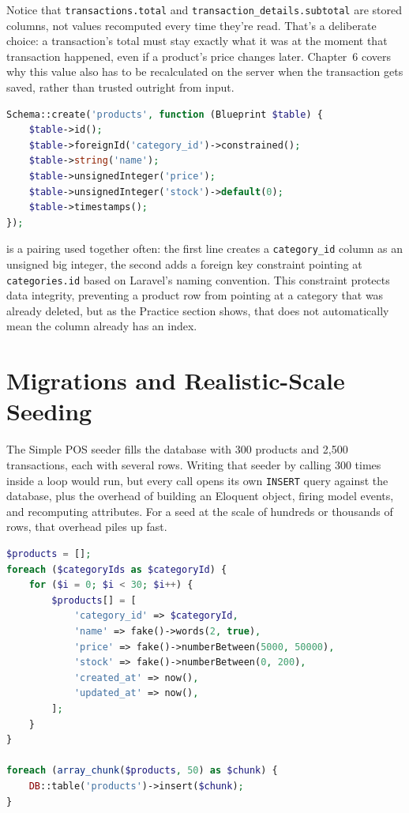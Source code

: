 Notice that \texttt{transactions.total} and
\texttt{transaction\_details.subtotal} are stored columns, not values
recomputed every time they're read. That's a deliberate choice: a
transaction's total must stay exactly what it was at the moment that
transaction happened, even if a product's price changes later.
Chapter~6 covers why this value also has to be recalculated on the
server when the transaction gets saved, rather than trusted outright
from input.

\begin{lstlisting}[language=php, title=\lstfile{database/migrations/2026_08_20_122440_create_products_table.php}]
Schema::create('products', function (Blueprint $table) {
    $table->id();
    $table->foreignId('category_id')->constrained();
    $table->string('name');
    $table->unsignedInteger('price');
    $table->unsignedInteger('stock')->default(0);
    $table->timestamps();
});
\end{lstlisting}

 is a pairing used
together often: the first line creates a \texttt{category\_id} column as
an unsigned big integer, the second adds a foreign key constraint
pointing at \texttt{categories.id} based on Laravel's naming
convention. This constraint protects data integrity, preventing a
product row from pointing at a category that was already deleted, but
as the Practice section shows, that does not automatically mean the
column already has an index.

\section{Migrations and Realistic-Scale Seeding}
\label{sec:desain-basis-data-2}

The Simple POS seeder fills the database with 300 products and 2,500
transactions, each with several  rows.
Writing that seeder by calling  300 times
inside a loop would run, but every  call
opens its own \texttt{INSERT} query against the database, plus the
overhead of building an Eloquent object, firing model events, and
recomputing attributes. For a seed at the scale of hundreds or
thousands of rows, that overhead piles up fast.

\begin{lstlisting}[language=php, title=\lstfile{database/seeders/DatabaseSeeder.php}]
$products = [];
foreach ($categoryIds as $categoryId) {
    for ($i = 0; $i < 30; $i++) {
        $products[] = [
            'category_id' => $categoryId,
            'name' => fake()->words(2, true),
            'price' => fake()->numberBetween(5000, 50000),
            'stock' => fake()->numberBetween(0, 200),
            'created_at' => now(),
            'updated_at' => now(),
        ];
    }
}

foreach (array_chunk($products, 50) as $chunk) {
    DB::table('products')->insert($chunk);
}
\end{lstlisting}

